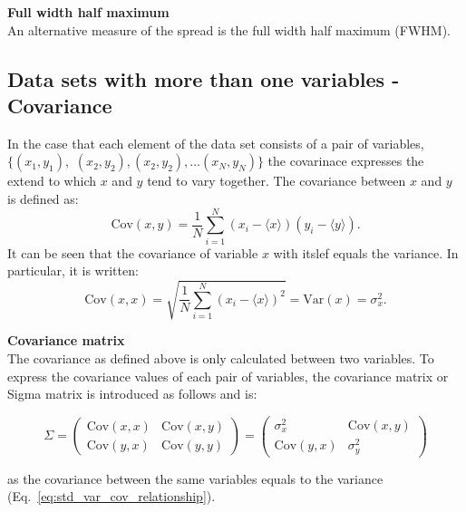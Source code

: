 
\normalsize{\textbf{Full width half maximum}}\\
An alternative measure of the spread is the full width half maximum (FWHM).


\subsection{Data sets with more than one variables - Covariance}
In the case that each element of the data set consists of a pair of variables, $\{(x_1, y_1),$ $(x_2, y_2), (x_2, y_2), ...(x_N, y_N)\}$ the covarinace expresses the extend to which $x$ and $y$ tend to vary together. The covariance between $x$ and $y$ is defined as:
\begin{equation}\label{eq:cov_def}
    \mathrm{Cov}(x, y) = \frac{1}{N} \sum_{i=1}^{N} (x_i-\langle x \rangle) (y_i-\langle y \rangle).
\end{equation}
It can be seen that the covariance of variable $x$ with itslef equals the variance. In particular, it is written:
\begin{equation}\label{eq:std_var_cov_relationship}
    \mathrm{Cov}(x, x) = \sqrt{\frac{1}{N} \sum_{i=1}^{N} (x_i-\langle x \rangle)^2} = \mathrm{Var}(x) = \sigma_x^2.
\end{equation}

\textbf{Covariance matrix}\\
The covariance as defined above is only calculated between two variables. To express the covariance values of each pair of variables, the covariance matrix or Sigma matrix is introduced as follows and is:

\begin{equation}\label{eq:Sigma_matrix}
    \Sigma = \begin{pmatrix}
        \mathrm{Cov}(x,x) & \mathrm{Cov}(x,y) \\ 
        \mathrm{Cov}(y,x) & \mathrm{Cov}(y,y) 
        \end{pmatrix}  = \begin{pmatrix}
            \sigma_x^2 & \mathrm{Cov}(x,y) \\ 
            \mathrm{Cov}(y,x) & \sigma_y^2 
            \end{pmatrix}
\end{equation}

as the covariance between the same variables equals to the variance (Eq.~\eqref{eq:std_var_cov_relationship}).

